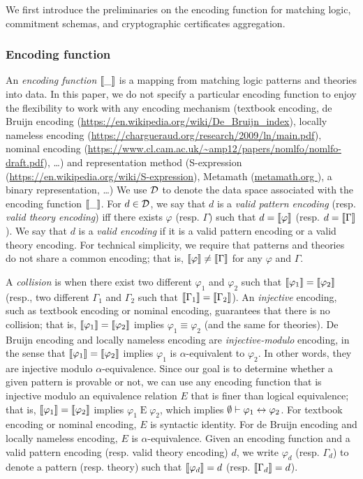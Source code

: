 \documentclass{article}
\begin{document}
We first introduce the preliminaries on the encoding function for matching logic,
commitment schemas, and cryptographic certificates aggregation. 

\subsubsection{Encoding function}

An \emph{encoding function} $\left\llbracket \_ \right\rrbracket$ 
is a mapping from matching logic patterns and theories into data. 
In this paper, we do not specify a particular encoding function
to enjoy the flexibility to work with
any encoding mechanism
(textbook encoding, de Bruijn encoding (\url{https://en.wikipedia.org/wiki/De_Bruijn_index}), 
locally nameless encoding (\url{https://chargueraud.org/research/2009/ln/main.pdf}), 
nominal encoding (\url{https://www.cl.cam.ac.uk/~amp12/papers/nomlfo/nomlfo-draft.pdf}), \ldots)
and representation method 
(S-expression (\url{https://en.wikipedia.org/wiki/S-expression}), 
 Metamath (\url{metamath.org }), a binary representation, \ldots)
We use $\mathcal{D}$ to denote the data space associated with the encoding function
$\left\llbracket \_ \right\rrbracket$. 
For $d \in \mathcal{D}$,
we say that $d$ is a \emph{valid pattern encoding} 
(resp. \emph{valid theory encoding}) iff
there exists $\varphi$ (resp. $\Gamma$)
such that $d = \left\llbracket \varphi \right\rrbracket$ (resp. $d = \left\llbracket \Gamma \right\rrbracket$). 
We say that $d$ is a \emph{valid encoding} if it is 
a valid pattern encoding or a valid theory encoding. 
For technical simplicity, we require that patterns and theories 
do not share a common encoding; that is,
$\left\llbracket \varphi \right\rrbracket \neq \left\llbracket \Gamma \right\rrbracket$ for any $\varphi$ and $\Gamma$. 


A \emph{collision} is when there exist two different $\varphi_1$ and $\varphi_2$ such that $\left\llbracket \varphi_1 \right\rrbracket = \left\llbracket \varphi_2 \right\rrbracket$
(resp., two different $\Gamma_1$ and $\Gamma_2$ such that $\left\llbracket \Gamma_1 \right\rrbracket = \left\llbracket \Gamma_2 \right\rrbracket$). 
An \emph{injective} encoding, such as textbook encoding or nominal encoding,
guarantees that there is no collision;
that is, $\left\llbracket \varphi_1 \right\rrbracket = \left\llbracket \varphi_2 \right\rrbracket$ implies $\varphi_1 \equiv \varphi_2$
(and the same for theories). 
De Bruijn encoding and locally nameless encoding are \emph{injective-modulo} encoding, in the sense that
$\left\llbracket \varphi_1 \right\rrbracket = \left\llbracket \varphi_2 \right\rrbracket$ implies $\varphi_1$ is $\alpha$-equivalent to
$\varphi_2$. 
In other words, they are injective modulo $\alpha$-equivalence. 
Since our goal is to determine whether a given pattern is provable or not, 
we can use any encoding function that is injective modulo an equivalence relation $E$
that is finer than logical equivalence;
that is, $\left\llbracket \varphi_1 \right\rrbracket = \left\llbracket \varphi_2 \right\rrbracket$ implies $\varphi_1 \mathbin{E} \varphi_2$, which implies $\emptyset \vdash \varphi_1 \leftrightarrow \varphi_2$. 
For textbook encoding or nominal encoding, $E$ is syntactic identity. 
For de Bruijn encoding and locally nameless encoding, $E$ is $\alpha$-equivalence. 
Given an encoding function and a valid pattern encoding
(resp. valid theory encoding) $d$,
we write $\varphi_d$ (resp. $\Gamma_d$) to denote a pattern (resp. theory)
such that $\left\llbracket \varphi_d \right\rrbracket = d$ (resp. $\left\llbracket \Gamma_d \right\rrbracket = d$). 
\end{document}
